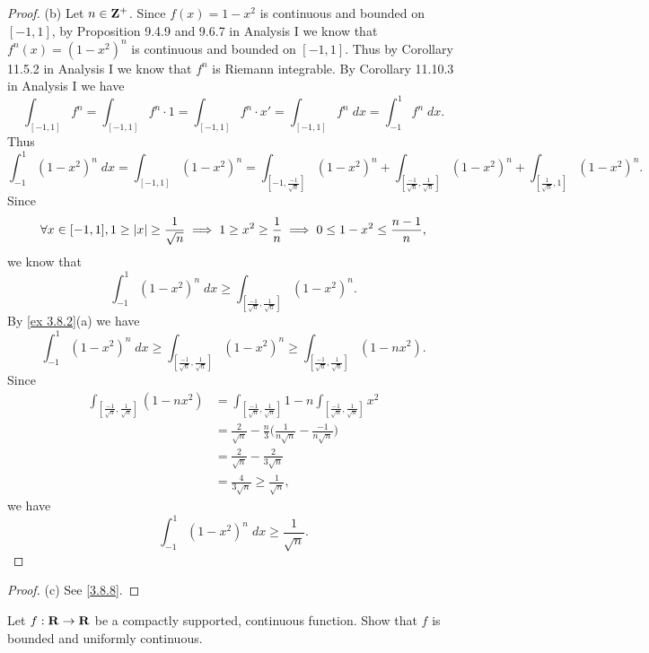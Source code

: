 \begin{proof}{(b)}
  Let \(n \in \mathbf{Z}^+\).
  Since \(f(x) = 1 - x^2\) is continuous and bounded on \([-1, 1]\), by Proposition 9.4.9 and 9.6.7 in Analysis I we know that \(f^n(x) = (1 - x^2)^n\) is continuous and bounded on \([-1, 1]\).
  Thus by Corollary 11.5.2 in Analysis I we know that \(f^n\) is Riemann integrable.
  By Corollary 11.10.3 in Analysis I we have
  \[
    \int_{[-1, 1]} f^n = \int_{[-1, 1]} f^n \cdot 1 = \int_{[-1, 1]} f^n \cdot x' = \int_{[-1, 1]} f^n \; dx = \int_{-1}^1 f^n \; dx.
  \]
  Thus
  \[
    \int_{-1}^1 (1 - x^2)^n \; dx = \int_{[-1, 1]} (1 - x^2)^n = \int_{[-1, \frac{-1}{\sqrt{n}}]} (1 - x^2)^n + \int_{[\frac{-1}{\sqrt{n}}, \frac{1}{\sqrt{n}}]} (1 - x^2)^n + \int_{[\frac{1}{\sqrt{n}}, 1]} (1 - x^2)^n.
  \]
  Since
  \[
    \forall x \in [-1, 1], 1 \geq \left\lvert x\right\rvert \geq \frac{1}{\sqrt{n}} \implies 1 \geq x^2 \geq \frac{1}{n} \implies 0 \leq 1 - x^2 \leq \frac{n - 1}{n},
  \]
  we know that
  \[
    \int_{-1}^1 (1 - x^2)^n \; dx \geq \int_{[\frac{-1}{\sqrt{n}}, \frac{1}{\sqrt{n}}]} (1 - x^2)^n.
  \]
  By \cref{ex 3.8.2}(a) we have
  \[
    \int_{-1}^1 (1 - x^2)^n \; dx \geq \int_{[\frac{-1}{\sqrt{n}}, \frac{1}{\sqrt{n}}]} (1 - x^2)^n \geq \int_{[\frac{-1}{\sqrt{n}}, \frac{1}{\sqrt{n}}]} (1 - n x^2).
  \]
  Since
  \begin{align*}
    \int_{[\frac{-1}{\sqrt{n}}, \frac{1}{\sqrt{n}}]} (1 - n x^2) & = \int_{[\frac{-1}{\sqrt{n}}, \frac{1}{\sqrt{n}}]} 1 - n \int_{[\frac{-1}{\sqrt{n}}, \frac{1}{\sqrt{n}}]} x^2 \\
                                                                 & = \frac{2}{\sqrt{n}} - \frac{n}{3} \bigg(\frac{1}{n \sqrt{n}} - \frac{-1}{n \sqrt{n}}\bigg)                   \\
                                                                 & = \frac{2}{\sqrt{n}} - \frac{2}{3 \sqrt{n}}                                                                   \\
                                                                 & = \frac{4}{3 \sqrt{n}} \geq \frac{1}{\sqrt{n}},
  \end{align*}
  we have
  \[
    \int_{-1}^1 (1 - x^2)^n \; dx \geq \frac{1}{\sqrt{n}}.
  \]
\end{proof}

\begin{proof}{(c)}
  See \cref{3.8.8}.
\end{proof}

\begin{exercise}\label{ex 3.8.3}
  Let \(f : \mathbf{R} \to \mathbf{R}\) be a compactly supported, continuous function.
  Show that \(f\) is bounded and uniformly continuous.
\end{exercise}

